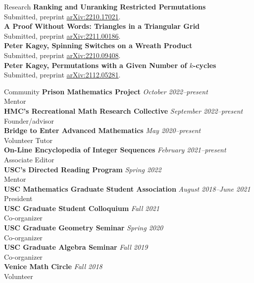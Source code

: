 \documentclass{cv} %
\begin{document}
\begin{rSection}{Research}
  \textbf{Ranking and Unranking Restricted Permutations}\\
  Submitted, preprint \href{https://arxiv.org/abs/2210.17021}{arXiv:2210.17021}.\\
  \textbf{A Proof Without Words: Triangles in a Triangular Grid} \\
  Submitted, preprint \href{https://arxiv.org/abs/2211.00186}{arXiv:2211.00186}.\\
  \textbf{Peter Kagey, Spinning Switches on a Wreath Product} \\
  Submitted, preprint \href{https://arxiv.org/abs/2210.09408}{arXiv:2210.09408}.\\
  \textbf{Peter Kagey, Permutations with a Given Number of $k$-cycles} \\
  Submitted, preprint \href{https://arxiv.org/abs/2112.05281}{arXiv:2112.05281}.\\
\end{rSection}
\pagebreak
\begin{rSection}{Community}
  \textbf{Prison Mathematics Project} \hfill \textit{October 2022--present}\\
  Mentor \\
  \textbf{HMC's Recreational Math Research Collective} \hfill \textit{September 2022--present}\\
  Founder/advisor \\
  \textbf{Bridge to Enter Advanced Mathematics} \hfill \textit{May 2020--present}\\
  Volunteer Tutor \\
  \textbf{On-Line Encyclopedia of Integer Sequences} \hfill \textit{February 2021--present}\\
  Associate Editor \\
  \textbf{USC's Directed Reading Program} \hfill \textit{Spring 2022}\\
  Mentor \\
  \textbf{USC Mathematics Graduate Student Association} \hfill \textit{August 2018--June 2021}\\
  President \\
  \textbf{USC Graduate Student Colloquium} \hfill \textit{Fall 2021}\\
  Co-organizer \\
  \textbf{USC Graduate Geometry Seminar} \hfill \textit{Spring 2020}\\
  Co-organizer \\
  \textbf{USC Graduate Algebra Seminar} \hfill \textit{Fall 2019}\\
  Co-organizer\\
  \textbf{Venice Math Circle} \hfill \textit{Fall 2018}\\
  Volunteer
\end{rSection}
\end{document}
